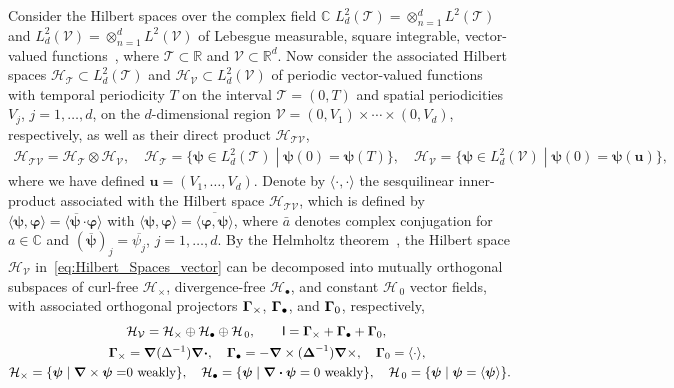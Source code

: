 \documentclass[leqno,onefignum,onetabnum]{siamltex1213}
\newcommand{\Tc}{\mathcal{T}}
\newcommand{\Vc}{\mathcal{V}}
\newcommand{\Hc}{\mathcal{H}}
\newcommand{\Ib}{\mathsf{I}}
\newcommand\bDelta{\mbox{\boldmath${\Delta}$}}
\newcommand\bGamma{\mbox{\boldmath${\Gamma}$}}
\newcommand\bnabla{\mbox{\boldmath${\nabla}$}}
\providecommand\bcdot{\boldsymbol{\cdot}}
\newcommand{\vecu}{\boldsymbol{u}}
\newcommand{\vecpsi}{\boldsymbol{\psi}}
\newcommand{\vecvarphi}{\boldsymbol{\varphi}}
\begin{document}
Consider the Hilbert spaces over the complex field $\mathbb{C}$
$L^2_d(\Tc)=\otimes_{n=1}^dL^2(\Tc)$ and
$L^2_d(\Vc)=\otimes_{n=1}^dL^2(\Vc)$ 
of Lebesgue measurable, square integrable, vector-valued
functions~\cite{Folland:99:RealAnalysis}, where $\Tc\subset\mathbb{R}$ and
$\Vc\subset\mathbb{R}^d$. Now  
consider the associated Hilbert spaces $\Hc_{\Tc}\subset L^2_d(\Tc)$ and
$\Hc_{\Vc}\subset L^2_d(\Vc)$ of periodic vector-valued functions with
temporal periodicity $T$ on the interval $\Tc=(0,T)$ and spatial
periodicities $V_j$, $j=1,\ldots,d$, on the $d$-dimensional region
$\Vc=(0,V_1)\times\cdots\times(0,V_d)$, respectively, as well as their direct product 
$\Hc_{\Tc\Vc}$,
%
\begin{align}%
  \Hc_{\Tc\Vc}=\Hc_{\Tc}\otimes\Hc_{\Vc}, \quad
  \Hc_{\Tc}=\{ 
     \vecpsi\in L^2_d(\Tc)\;|\;
     \vecpsi(0)=\vecpsi(T) 
                        \}, \quad
  \Hc_{\Vc}=\{ 
     \vecpsi\in L^2_d(\Vc)\;|\;
     \vecpsi(0)=\vecpsi(\vecu ) 
                        \}, 
\end{align}
%
where we have defined $\vecu =(V_1,\ldots,V_d)$. Denote by $\langle\cdot,\cdot\rangle$ the
sesquilinear inner-product associated with the Hilbert space
$\Hc_{\Tc\Vc}$, which is defined by
$\langle\vecpsi,\vecvarphi\rangle=\langle\overline{\vecpsi\,}\bcdot\vecvarphi\rangle$  with 
$\langle\vecpsi,\vecvarphi\rangle=\overline{\langle\vecvarphi,\vecpsi\rangle}$, where $\bar{a}$ 
denotes complex conjugation for $a\in\mathbb{C}$ and
$(\overline{\vecpsi})_j=\overline{\psi_j}$, $j=1,\ldots,d$. By the Helmholtz
theorem~\cite{Denaro:2003:0271,Bhatia:IEE:1077}, the Hilbert space
$\Hc_{\Vc}$ in~\eqref{eq:Hilbert_Spaces_vector} can be decomposed into
mutually orthogonal subspaces of curl-free $\Hc_\times$, divergence-free
$\Hc_\bullet$, and constant $\Hc_{\,0}$ vector fields, with associated
orthogonal projectors $\bGamma_\times$, $\bGamma_\bullet$, and $\bGamma_0$,
respectively,~\cite{Fannjiang:1994:SIAM_JAM:333,MILTON:2002:TC}    
%
\begin{align}%
  &\Hc_{\Vc}=\Hc_\times\oplus\Hc_\bullet\oplus\Hc_{\,0},\qquad
  \Ib=\bGamma_\times+\bGamma_\bullet+\bGamma_0, \\
  \bGamma_\times&=\bnabla (\Delta^{-1})\bnabla \bcdot, \quad
  \bGamma_\bullet=-\bnabla \times(\bDelta^{-1})\bnabla \times, \quad
  \bGamma_0=\langle\cdot\rangle, \quad
  \notag \\
  \Hc_\times=\{\vecpsi\;|\;\bnabla \times\vecpsi=&0 \text{ weakly}\}, \quad
  \Hc_\bullet
      =\{\vecpsi\;|\;\bnabla \bcdot\vecpsi=0 \text{ weakly}\},   \quad
  \Hc_{\,0}
      =\{\vecpsi\;|\;\vecpsi=\langle\vecpsi\rangle\}.
     \notag  
\end{align}
%
\end{document}
